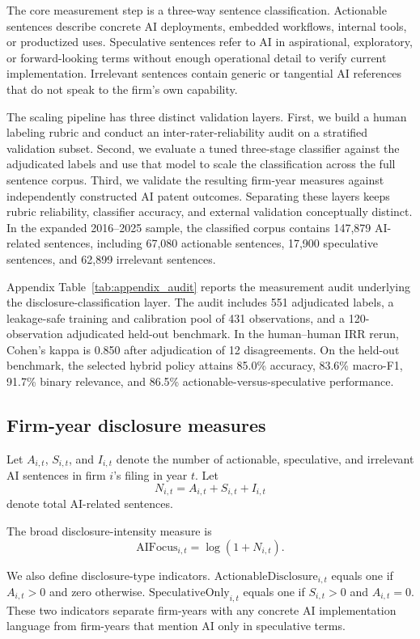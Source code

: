 The core measurement step is a three-way sentence classification. Actionable sentences describe concrete AI deployments, embedded workflows, internal tools, or productized uses. Speculative sentences refer to AI in aspirational, exploratory, or forward-looking terms without enough operational detail to verify current implementation. Irrelevant sentences contain generic or tangential AI references that do not speak to the firm's own capability.

The scaling pipeline has three distinct validation layers. First, we build a human labeling rubric and conduct an inter-rater-reliability audit on a stratified validation subset. Second, we evaluate a tuned three-stage classifier against the adjudicated labels and use that model to scale the classification across the full sentence corpus. Third, we validate the resulting firm-year measures against independently constructed AI patent outcomes. Separating these layers keeps rubric reliability, classifier accuracy, and external validation conceptually distinct. In the expanded 2016--2025 sample, the classified corpus contains 147,879 AI-related sentences, including 67,080 actionable sentences, 17,900 speculative sentences, and 62,899 irrelevant sentences.

Appendix Table~\ref{tab:appendix_audit} reports the measurement audit underlying the disclosure-classification layer. The audit includes 551 adjudicated labels, a leakage-safe training and calibration pool of 431 observations, and a 120-observation adjudicated held-out benchmark. In the human--human IRR rerun, Cohen's kappa is 0.850 after adjudication of 12 disagreements. On the held-out benchmark, the selected hybrid policy attains 85.0\% accuracy, 83.6\% macro-F1, 91.7\% binary relevance, and 86.5\% actionable-versus-speculative performance.

\subsection{Firm-year disclosure measures}

Let $A_{i,t}$, $S_{i,t}$, and $I_{i,t}$ denote the number of actionable, speculative, and irrelevant AI sentences in firm $i$'s filing in year $t$. Let
\[
N_{i,t} = A_{i,t} + S_{i,t} + I_{i,t}
\]
denote total AI-related sentences.

The broad disclosure-intensity measure is
\[
\mathrm{AIFocus}_{i,t} = \log(1 + N_{i,t}).
\]

We also define disclosure-type indicators. $\mathrm{ActionableDisclosure}_{i,t}$ equals one if $A_{i,t} > 0$ and zero otherwise. $\mathrm{SpeculativeOnly}_{i,t}$ equals one if $S_{i,t} > 0$ and $A_{i,t} = 0$. These two indicators separate firm-years with any concrete AI implementation language from firm-years that mention AI only in speculative terms.

